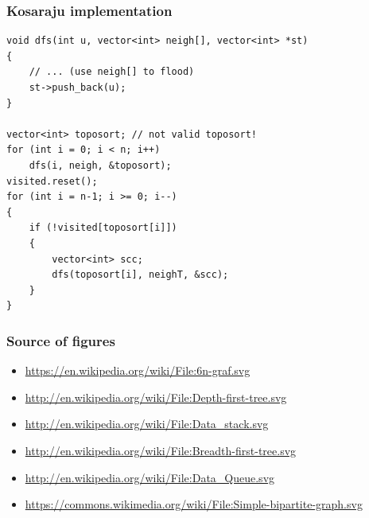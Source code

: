 \documentclass[12pt]{beamer}
\begin{document}
\begin{frame}[fragile]
\frametitle{Kosaraju implementation}
\begin{lstlisting}
void dfs(int u, vector<int> neigh[], vector<int> *st)
{
    // ... (use neigh[] to flood)
    st->push_back(u);
}

vector<int> toposort; // not valid toposort!
for (int i = 0; i < n; i++)
    dfs(i, neigh, &toposort);
visited.reset();
for (int i = n-1; i >= 0; i--)
{
    if (!visited[toposort[i]])
    {
        vector<int> scc;
        dfs(toposort[i], neighT, &scc);
    }
}
\end{lstlisting}
\end{frame}

\begin{frame}
\frametitle{Source of figures}
\begin{itemize}
\item \url{https://en.wikipedia.org/wiki/File:6n-graf.svg}
\item \url{http://en.wikipedia.org/wiki/File:Depth-first-tree.svg}
\item \url{http://en.wikipedia.org/wiki/File:Data_stack.svg}
\item \url{http://en.wikipedia.org/wiki/File:Breadth-first-tree.svg}
\item \url{http://en.wikipedia.org/wiki/File:Data_Queue.svg}
\item \url{https://commons.wikimedia.org/wiki/File:Simple-bipartite-graph.svg}
\end{itemize}
\end{frame}
\end{document}
